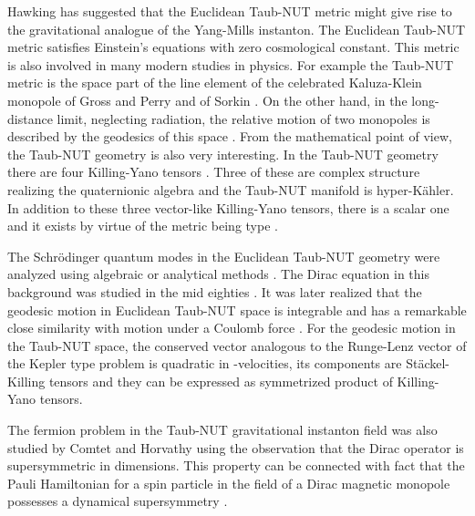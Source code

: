 \documentclass[a4paper,12pt]{article}
\begin{document}
Hawking \cite{Ha} has suggested that the Euclidean Taub-NUT metric 
might give rise to the gravitational analogue of the Yang-Mills 
instanton. The Euclidean Taub-NUT metric satisfies Einstein's equations 
with zero cosmological constant. 
This  metric  is also involved in many modern studies in physics.
For example the Taub-NUT metric is the space part of the line element 
of the celebrated Kaluza-Klein monopole of Gross and Perry \cite{GP} and 
of Sorkin \cite{So}. On the other hand, in the 
long-distance limit, neglecting radiation, the relative motion of two 
monopoles is described by the geodesics of this space \cite{G1}.
From the mathematical point of view, the Taub-NUT geometry is also very 
interesting. In the Taub-NUT geometry there are four Killing-Yano tensors 
\cite{GR}. Three of these are complex structure realizing the quaternionic 
algebra and the Taub-NUT manifold is hyper-K\" ahler. In addition to these 
three vector-like Killing-Yano tensors, there is a scalar one and it 
exists by virtue of the metric being type \coordHE{}.

The Schr\" odinger quantum modes in the Euclidean Taub-NUT geometry were 
analyzed  using algebraic \cite{G2} or analytical methods \cite{CV}.
The Dirac equation in this background was studied in the mid eighties 
\cite{DIRAC}. It was later realized that the geodesic motion in 
Euclidean Taub-NUT space is integrable and has a remarkable close 
similarity with motion under a Coulomb force \cite{GR,G2}. For the 
geodesic motion in the Taub-NUT space, the conserved vector analogous 
to the Runge-Lenz vector of the Kepler type problem is quadratic in 
\coordHE{}-velocities, its components are St\" ackel-Killing tensors and they 
can be expressed as symmetrized product of Killing-Yano tensors.

The fermion problem in the Taub-NUT gravitational instanton field was 
also studied by Comtet and Horvathy \cite{CH} using the observation 
that the Dirac operator is supersymmetric in \coordHE{} dimensions. This 
property can be connected with fact that the Pauli Hamiltonian for a 
spin \coordHE{} particle in the field of a Dirac magnetic monopole 
possesses a dynamical supersymmetry \cite{DYON}. 
\end{document}
